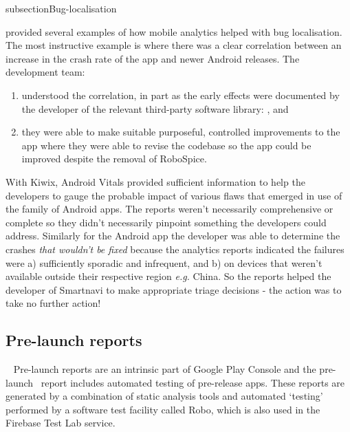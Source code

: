 subsection{Bug-localisation}

 provided several examples of how mobile analytics helped with bug localisation. The most instructive example is where there was a clear correlation between an increase in the crash rate of the app and newer Android releases. The development team:

\begin{enumerate}[label=(\alph*)]
    \item understood the correlation, in part as the early effects were documented by the developer of the relevant third-party software library: , and 
    \item they were able to make suitable purposeful, controlled improvements to the app where they were able to revise the codebase so the app could be improved despite the removal of RoboSpice.
\end{enumerate}

With Kiwix, Android Vitals provided sufficient information to help the developers to gauge the probable impact of various flaws that emerged in use of the family of Android apps. The reports weren't necessarily comprehensive or complete so they didn't necessarily pinpoint something the developers could address. Similarly for the  Android app the developer was able to determine the crashes \emph{that wouldn't be fixed} because the analytics reports indicated the failures were a) sufficiently sporadic and infrequent, and b) on devices that weren't available outside their respective region \emph{e.g.} China. So the reports helped the developer of Smartnavi to make appropriate triage decisions - the action was to take no further action! 

\subsection{Pre-launch reports}~\label{tata-pre-launch-reports-topic}
Pre-launch reports are an intrinsic part of Google Play Console and the pre-launch~ report includes automated testing of pre-release apps. These reports are generated by a combination of static analysis tools and automated `testing' performed by a software test facility called Robo, which is also used in the Firebase Test Lab service.


